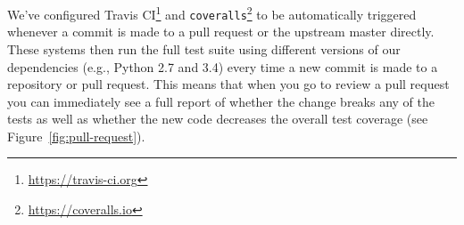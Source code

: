 %
%





We've configured Travis CI\footnote{\url{https://travis-ci.org}} and
\texttt{coveralls}\footnote{\url{https://coveralls.io}} to be automatically
triggered whenever a commit is made to a pull request or the upstream
master directly.  These systems then run the full test suite 
using different versions of our dependencies (e.g., Python 2.7 and 3.4) %
every time a
new commit is made to a repository or pull request.
This means that when you go to review a pull request you can immediately see
a full report of whether the change breaks any of the tests as well as whether
the new code decreases the overall test coverage (see Figure~\ref{fig:pull-request}).

